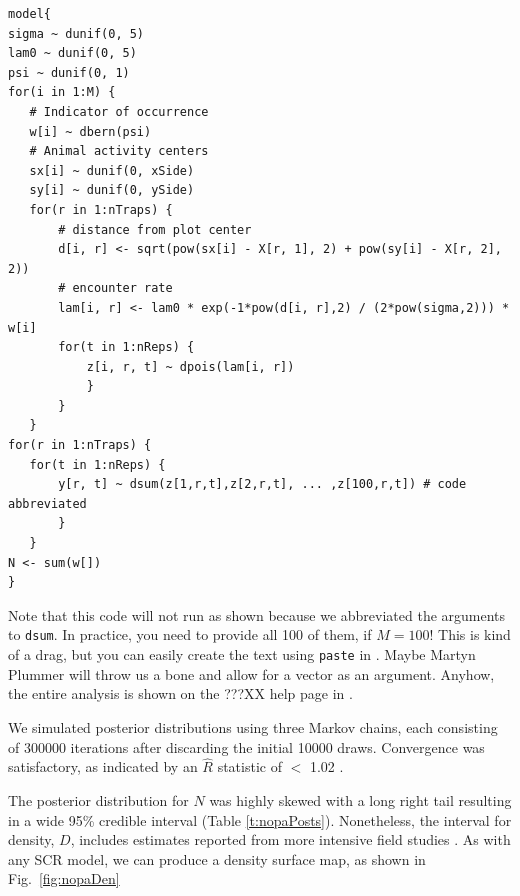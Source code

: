 \begin{verbatim}
model{
sigma ~ dunif(0, 5)
lam0 ~ dunif(0, 5)
psi ~ dunif(0, 1)
for(i in 1:M) {
   # Indicator of occurrence
   w[i] ~ dbern(psi)
   # Animal activity centers
   sx[i] ~ dunif(0, xSide)
   sy[i] ~ dunif(0, ySide)
   for(r in 1:nTraps) {
       # distance from plot center
       d[i, r] <- sqrt(pow(sx[i] - X[r, 1], 2) + pow(sy[i] - X[r, 2], 2))
       # encounter rate
       lam[i, r] <- lam0 * exp(-1*pow(d[i, r],2) / (2*pow(sigma,2))) * w[i]
       for(t in 1:nReps) {
           z[i, r, t] ~ dpois(lam[i, r])
           }
       }
   }
for(r in 1:nTraps) {
   for(t in 1:nReps) {
       y[r, t] ~ dsum(z[1,r,t],z[2,r,t], ... ,z[100,r,t]) # code abbreviated
       }
   }
N <- sum(w[])
}
\end{verbatim}

Note that this code will not run as shown because we abbreviated the
arguments to \verb+dsum+. In practice, you need to provide all 100 of
them, if $M=100$! This is kind of a drag, but you can easily create
the text using \verb+paste+ in \R. Maybe Martyn Plummer will throw us
a bone and allow for a vector as an argument. Anyhow, the entire
analysis is shown on the ???XX help page in \scrbook.


We simulated posterior
distributions using three Markov chains,
each consisting of 300000 iterations after discarding the initial 10000
draws. Convergence was satisfactory, as indicated by an $\hat{R}$
statistic of $<$ 1.02 \citep{gelman_rubin:1992}.


The posterior distribution for
$N$ was highly skewed with a long right tail resulting in a wide 95\%
credible interval (Table \ref{t:nopaPosts}). Nonetheless, the interval
for density, $D$, includes estimates reported from more intensive field
studies \citep{moldenhaer_regelski:1996}. As with any SCR model,
we can produce a density surface map, as shown in Fig.~\ref{fig:nopaDen}


